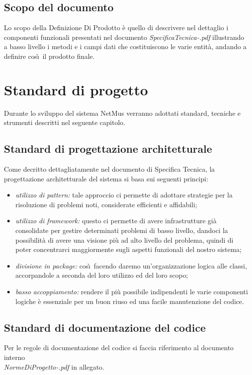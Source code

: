\section{Scopo del documento}
Lo scopo della Definizione Di Prodotto \`e quello di descrivere nel dettaglio i
componenti funzionali presentati nel documento
\emph{SpecificaTecnica-\versionespecifica.pdf} illustrando a basso livello i
metodi e i campi dati che costituiscono le varie entit\`a, andando a definire
cos\`\i\ il prodotto finale.



\chapter{Standard di progetto}
\thispagestyle{fancy} %
Durante lo sviluppo del sistema NetMus verranno adottati standard,
tecniche e strumenti descritti nel seguente capitolo.

\section{Standard di progettazione architetturale}
Come decritto dettagliatamente nel documento di Specifica Tecnica, la
progettazione architetturale del sistema si basa sui seguenti principi:

\begin{itemize}
  \item \emph{utilizzo di pattern:} tale approccio ci permette di adottare
  strategie per la risoluzione di problemi noti, considerate efficienti e affidabili;
  \item \emph{utilizzo di framework:} questo ci permette di avere infrastrutture
  gi\`a consolidate per gestire determinati problemi di basso livello, dandoci
  la possibilit\`a di avere una visione pi\`u ad alto livello del problema,
  quindi di poter concentrarci maggiormente sugli aspetti funzionali del nostro
  sistema;
  \item \emph{divisione in package:} cos\`\i\ facendo daremo un'organizzazione
  logica alle classi, accorpandole a seconda del loro utilizzo ed del loro
  scopo;
  \item \emph{basso accoppiamento:} rendere il pi\`u possibile indipendenti le
  varie componenti logiche \`e essenziale per un buon riuso ed una facile
  manutenzione del codice.
\end{itemize}

\section{Standard di documentazione del codice}
Per le regole di documentazione del codice si faccia riferimento al documento
interno\\ \emph{NormeDiProgetto-\versionenormeprogetto.pdf} in allegato.

